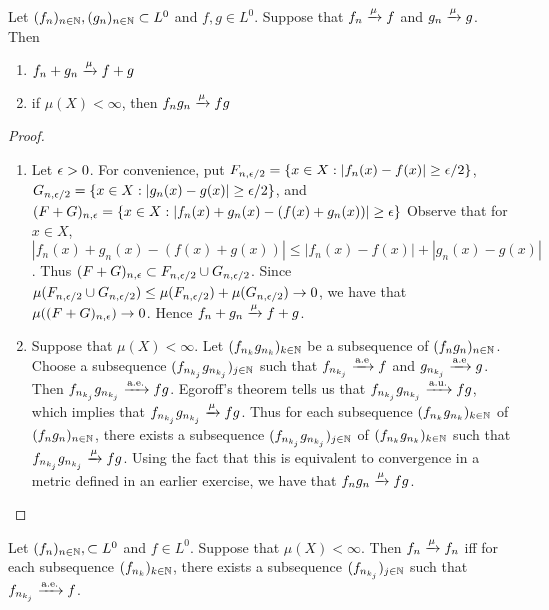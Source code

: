 \documentclass{book}
\begin{document}
	\begin{ex}  
		Let $(f_n)_{n \in \mathbb{N}}, (g_n)_{n \in \mathbb{N}} \subset L^0$ and $f,g \in L^0$. Suppose that $f_n \xrightarrow{\mu} f$ and $g_n \xrightarrow{\mu}g$. Then 
		\begin{enumerate}
			\item $f_n + g_n \xrightarrow{\mu} f+g$
			\item if $\mu(X) < \infty$, then $f_n g_n \xrightarrow{\mu} fg$
		\end{enumerate}
	\end{ex}
	
	\begin{proof}
		
		\begin{enumerate}
			\item Let $\epsilon > 0$. For convenience, put $F_{n,\epsilon/2} = \{x \in X: |f_n(x) - f(x)| \geq \epsilon/2\}$, $G_{n, \epsilon/2} = \{x \in X: |g_n(x) - g(x)| \geq \epsilon/2\}$, and $(F+G)_{n,\epsilon} = \{x \in X: |f_n(x)+g_n(x) - (f(x) + g_n(x))| \geq \epsilon\}$ Observe that for $x \in X$, $|f_n(x) + g_n(x) - (f(x) + g(x))| \leq |f_n(x) - f(x)| + |g_n(x) - g(x)|$. Thus $(F+G)_{n,\epsilon} \subset F_{n,\epsilon/2} \cup G_{n, \epsilon/2}$. Since $\mu(F_{n,\epsilon/2} \cup G_{n, \epsilon/2}) \leq \mu(F_{n,\epsilon/2}) + \mu(G_{n, \epsilon/2}) \rightarrow 0$, we have that $\mu((F+G)_{n,\epsilon}) \rightarrow 0$. Hence $f_n + g_n \xrightarrow{\mu} f+g$.
			
			\item Suppose that $\mu(X) < \infty$. Let $(f_{n_k}g_{n_k})_{k \in \mathbb{N}}$ be a subsequence of $(f_ng_n)_{n \in \mathbb{N}}$. Choose a subsequence $(f_{n_{k_j}}g_{n_{k_j}})_{j \in \mathbb{N}}$ such that $f_{n_{k_j}} \xrightarrow{\text{a.e}} f$ and $g_{n_{k_j}} \xrightarrow{\text{a.e}} g$. Then $f_{n_{k_j}}g_{n_{k_j}} \xrightarrow{\text{a.e.}} fg$. Egoroff's theorem tells us that $f_{n_{k_j}}g_{n_{k_j}} \xrightarrow{\text{a.u.}} fg$, which implies that $f_{n_{k_j}}g_{n_{k_j}} \xrightarrow{\mu} fg$. Thus for each subsequence $(f_{n_k}g_{n_k})_{k \in \mathbb{N}}$ of $(f_ng_n)_{n \in \mathbb{N}}$, there exists a subsequence $(f_{n_{k_j}}g_{n_{k_j}})_{j \in \mathbb{N}}$ of $(f_{n_k}g_{n_k})_{k \in \mathbb{N}}$ such that $f_{n_{k_j}}g_{n_{k_j}} \xrightarrow{\mu} fg$. Using the fact that this is equivalent to convergence in a metric defined in an earlier exercise,
			we have that $f_ng_n \xrightarrow{\mu} fg$.
		\end{enumerate}
		
	\end{proof}
	
	\begin{ex}  
		Let $(f_n)_{n \in \mathbb{N}}, \subset L^0$ and $f \in L^0$. Suppose that $\mu(X) < \infty$. Then $f_n \xrightarrow{\mu}f_n$ iff for each subsequence $(f_{n_k})_{k \in \mathbb{N}}$, there exists a subsequence $(f_{n_{k_j}})_{j \in \mathbb{N}}$ such that $f_{n_{k_j}} \xrightarrow{\text{a.e.}} f$.
	\end{ex}
	
\end{document}
